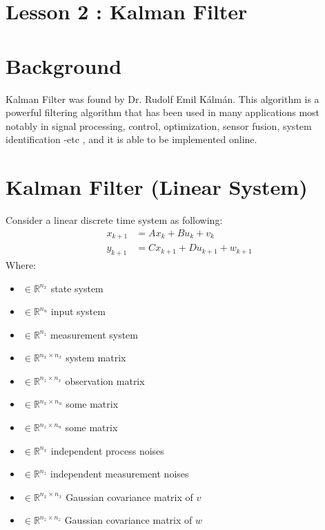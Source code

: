 \documentclass[12pt,a4paper]{article}
\begin{document}
	\section*{\centering Lesson 2 : Kalman Filter}
	\section{Background}
	Kalman Filter was found by Dr. Rudolf Emil Kálmán. This algorithm is a powerful filtering algorithm that has been used in many applications most notably in signal processing, control, optimization, sensor fusion, system identification -etc , and it is able to be implemented online.
	\section{Kalman Filter (Linear System)}
	Consider a linear discrete time system as following:
	\begin{equation}
		\begin{split}
			x_{k+1} &= Ax_k + Bu_k + v_k \\
			y_{k+1} &= Cx_{k+1} + Du_{k+1} + w_{k+1}
		\end{split}
		\label{eq1}
	\end{equation}
	Where:
	\begin{itemize}
		\item { \(\in \mathbb{R}^{n_x}\) state system}
		\item { \(\in \mathbb{R}^{n_u}\) input system}
		\item { \(\in \mathbb{R}^{n_z}\) measurement system}
		\item { \(\in \mathbb{R}^{n_x \times n_x}\) system matrix}
		\item { \(\in \mathbb{R}^{n_z \times n_x}\) observation matrix}
		\item { \(\in \mathbb{R}^{n_x \times n_u}\) some matrix}
		\item { \(\in \mathbb{R}^{n_z \times n_u}\) some matrix}
		\item { \(\in \mathbb{R}^{n_x}\) independent process noises}
		\item { \(\in \mathbb{R}^{n_z}\) independent measurement noises}
		\item { \(\in \mathbb{R}^{n_x \times n_x}\) Gaussian covariance matrix of \(v\)}
		\item { \(\in \mathbb{R}^{n_z \times n_z}\) Gaussian covariance matrix of \(w\)}
	\end{itemize}
\end{document}
